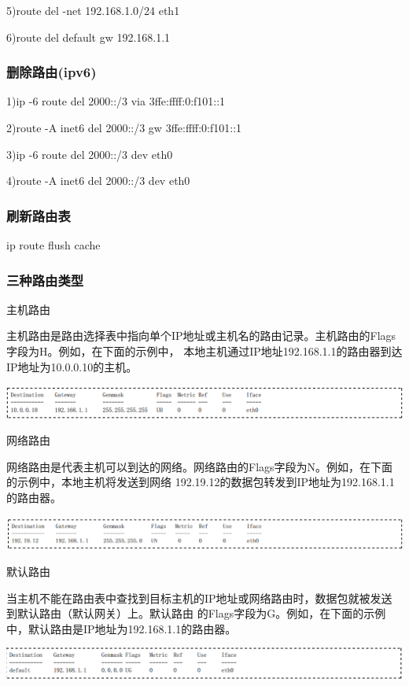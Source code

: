 \documentclass[letterpaper,10pt]{sphinxmanual}
\begin{document}
5)route del -net 192.168.1.0/24 eth1

6)route del default gw 192.168.1.1


\subsubsection{删除路由(ipv6)}
\label{Linux_net/route:id3}
1)ip -6 route del 2000::/3 via 3ffe:ffff:0:f101::1

2)route -A inet6 del 2000::/3 gw 3ffe:ffff:0:f101::1

3)ip -6 route del 2000::/3 dev eth0

4)route -A inet6 del 2000::/3 dev eth0


\subsubsection{刷新路由表}
\label{Linux_net/route:id4}
ip route flush  cache


\subsubsection{三种路由类型}
\label{Linux_net/route:id5}
主机路由

主机路由是路由选择表中指向单个IP地址或主机名的路由记录。主机路由的Flags字段为H。例如，在下面的示例中，
本地主机通过IP地址192.168.1.1的路由器到达IP地址为10.0.0.10的主机。

\includegraphics{host-route.png}

网络路由

网络路由是代表主机可以到达的网络。网络路由的Flags字段为N。例如，在下面的示例中，本地主机将发送到网络
192.19.12的数据包转发到IP地址为192.168.1.1的路由器。

\includegraphics{network-route.png}

默认路由

当主机不能在路由表中查找到目标主机的IP地址或网络路由时，数据包就被发送到默认路由（默认网关）上。默认路由
的Flags字段为G。例如，在下面的示例中，默认路由是IP地址为192.168.1.1的路由器。

\includegraphics{default-route.png}
\end{document}
